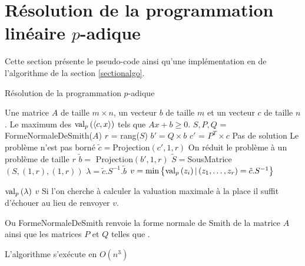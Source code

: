 \section{Résolution de la programmation linéaire \texorpdfstring{$p$}{p}-adique} 
\label{appendixalgo} 
Cette section présente le pseudo-code ainsi qu'une implémentation en \sage de l'algorithme de la section \ref{sectionalgo}.
 

\begin{algorithm}
\caption{Résolution de la programmation $p$-adique}
\begin{algorithmic}[0]
\Require Une matrice $A$ de taille $m \times n$, un vecteur $b$ de taille $m$ et un vecteur $c$ de taille $n$.
\Ensure Le maximum des $\text{val}_p\left(\left<c,x \right>\right)$ tels que $Ax+b\ge 0$. 
\State $S,P,Q$ = FormeNormaleDeSmith($A$)
\State $r$ = rang($S$)
\State $b' =Q \times b$
\State $c'$ = $P^T \times c$
\State \Failwith Pas de solution
\EndIf
\EndFor
{} 
\State \Failwith Le problème n'est pas borné
\EndIf
\EndFor
\State $\tilde{c} =$Projection$\left( c', 1, r \right) $ \Comment On réduit le problème à un problème de taille $r$ 
\State $\tilde{b} =$ Projection$\left(b', 1, r \right) $ 
\State $\tilde{S} = $SousMatrice$\left( S, (1,r),(1,r) \right) $
\State $\lambda = \tilde{c}. S^{-1}. \tilde{b} $
\State $v = \min \left\{\text{val}_p\left(z_{i}\right)| \left( z_1,\ldots,z_r \right) = \tilde{c}.S^{-1}  \right\}$

\Return $\text{val}_p\left( \lambda \right)$
\Else \Return $v$ \Comment Si l'on cherche à calculer la valuation maximale à la place il suffit d'échouer au lieu de renvoyer $v$.
\EndIf
\end{algorithmic}
\end{algorithm}

Ou FormeNormaleDeSmith renvoie la forme normale de Smith de la matrice $A$ ainsi que les matrices $P$ et $Q$ telles que . 

L'algorithme s'exécute en $O\left( n^3 \right) $
